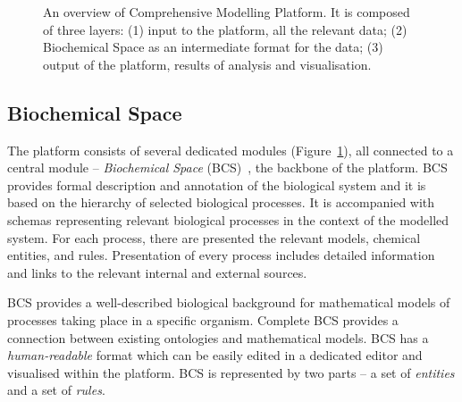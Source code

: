 \documentclass[12pt, twoside]{fithesis2} %
\begin{document}
\begin{figure}[!h]
\begin{center}
\end{center}
\caption{An overview of Comprehensive Modelling Platform. It is composed of three layers: (1) input to the platform, all the relevant data; (2) Biochemical Space as an intermediate format for the data; (3) output of the platform, results of analysis and visualisation.}\label{cmp_overview}
\end{figure}

\subsection{Biochemical Space}
\label{bcs_general}

The platform consists of several dedicated modules (Figure~\ref{cmp_overview}), all connected to a central module -- \emph{Biochemical Space} (BCS)~\cite{BCS}, the backbone of the platform. BCS provides formal description and annotation of the biological system and it is based on the hierarchy of selected biological processes. It is accompanied with schemas representing relevant biological processes in the context of the modelled system. For each process, there are presented the relevant models, chemical entities, and rules. Presentation of every process includes detailed information and links to the relevant internal and external sources.

BCS provides a well-described biological background for mathematical models of processes taking place in a specific organism. Complete BCS provides a connection between existing ontologies and mathematical models. BCS has a \emph{human-readable} format which can be easily edited in a dedicated editor and visualised within the platform. BCS is represented by two parts -- a set of \emph{entities} and a set of \emph{rules}.
\end{document}
